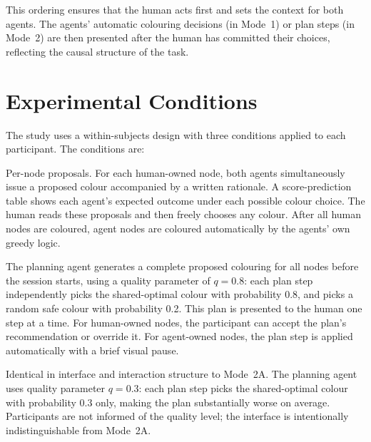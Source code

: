 \documentclass[11pt]{article}
\theoremstyle{definition}
\begin{document}
This ordering ensures that the human acts first and sets the context for both agents.
The agents' automatic colouring decisions (in Mode~1) or plan steps (in Mode~2) are
then presented after the human has committed their choices, reflecting the causal
structure of the task.

\section{Experimental Conditions}
\label{sec:conditions}

The study uses a within-subjects design with three conditions applied to each participant.
The conditions are:

\begin{description}[leftmargin=2em, itemsep=4pt]
  \item[Mode~1 — Manual Collaborative]
    Per-node proposals.  For each human-owned node, both agents
    simultaneously issue a proposed colour accompanied by a written rationale.
    A score-prediction table shows each agent's expected outcome under each
    possible colour choice.  The human reads these proposals and then freely
    chooses any colour.  After all human nodes are coloured, agent nodes are
    coloured automatically by the agents' own greedy logic.

  \item[Mode~2A — Autonomous, High Quality]
    The planning agent generates a complete proposed colouring for all nodes
    before the session starts, using a quality parameter of $q = 0.8$: each
    plan step independently picks the shared-optimal colour with probability
    0.8, and picks a random safe colour with probability 0.2.  This plan is
    presented to the human one step at a time.  For human-owned nodes, the
    participant can accept the plan's recommendation or override it.  For
    agent-owned nodes, the plan step is applied automatically with a brief
    visual pause.

  \item[Mode~2B — Autonomous, Low Quality]
    Identical in interface and interaction structure to Mode~2A.  The
    planning agent uses quality parameter $q = 0.3$: each plan step picks
    the shared-optimal colour with probability 0.3 only, making the plan
    substantially worse on average.  Participants are not informed of the
    quality level; the interface is intentionally indistinguishable from
    Mode~2A.
\end{description}
\end{document}
